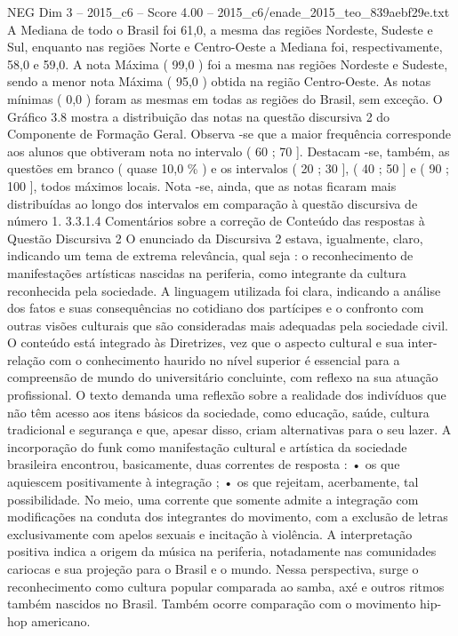 \begin{textsample}{NEG Dim 3 – 2015\_c6 – Score 4.00 – 2015\_c6/enade\_2015\_teo\_839aebf29e.txt}
A Mediana de todo o Brasil foi 61,0, a mesma das regiões Nordeste, Sudeste e Sul, enquanto nas regiões Norte e Centro-Oeste a Mediana foi, respectivamente, 58,0 e 59,0.
A nota Máxima ( 99,0 ) foi a mesma nas regiões Nordeste e Sudeste, sendo a menor nota Máxima ( 95,0 ) obtida na região Centro-Oeste.
As notas mínimas ( 0,0 ) foram as mesmas em todas as regiões do Brasil, sem exceção.
O Gráfico 3.8 mostra a distribuição das notas na questão discursiva 2 do Componente de Formação Geral.
Observa -se que a maior frequência corresponde aos alunos que obtiveram nota no intervalo ( 60 ; 70 ].
Destacam -se, também, as questões em branco ( quase 10,0 \% ) e os intervalos ( 20 ; 30 ], ( 40 ; 50 ] e ( 90 ; 100 ], todos máximos locais.
Nota -se, ainda, que as notas ficaram mais distribuídas ao longo dos intervalos em comparação à questão discursiva de número 1. 3.3.1.4 Comentários sobre a correção de Conteúdo das respostas à Questão Discursiva 2 O enunciado da Discursiva 2 estava, igualmente, claro, indicando um tema de extrema relevância, qual seja : o reconhecimento de manifestações artísticas nascidas na periferia, como integrante da cultura reconhecida pela sociedade.
A linguagem utilizada foi clara, indicando a análise dos fatos e suas consequências no cotidiano dos partícipes e o confronto com outras visões culturais que são consideradas mais adequadas pela sociedade civil.
O conteúdo está integrado às Diretrizes, vez que o aspecto cultural e sua inter-relação com o conhecimento haurido no nível superior é essencial para a compreensão de mundo do universitário concluinte, com reflexo na sua atuação profissional.
O texto demanda uma reflexão sobre a realidade dos indivíduos que não têm acesso aos itens básicos da sociedade, como educação, saúde, cultura tradicional e segurança e que, apesar disso, criam alternativas para o seu lazer.
A incorporação do funk como manifestação cultural e artística da sociedade brasileira encontrou, basicamente, duas correntes de resposta : • os que aquiescem positivamente à integração ; • os que rejeitam, acerbamente, tal possibilidade.
No meio, uma corrente que somente admite a integração com modificações na conduta dos integrantes do movimento, com a exclusão de letras exclusivamente com apelos sexuais e incitação à violência.
A interpretação positiva indica a origem da música na periferia, notadamente nas comunidades cariocas e sua projeção para o Brasil e o mundo.
Nessa perspectiva, surge o reconhecimento como cultura popular comparada ao samba, axé e outros ritmos também nascidos no Brasil.
Também ocorre comparação com o movimento hip-hop americano.

\end{textsample}
